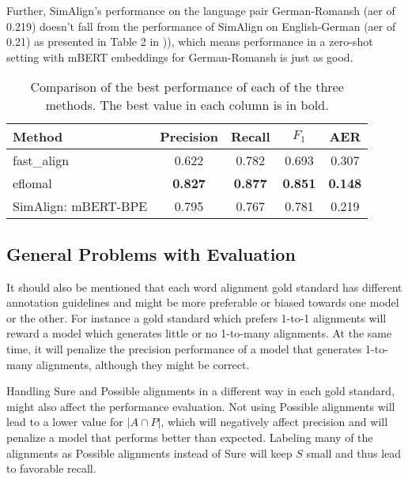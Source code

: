 Further,  SimAlign's performance on the language pair German-Romansh (\acrshort{aer} of 0.219) doesn't fall from the performance of SimAlign on English-German (\acrshort{aer} of 0.21)  as presented in Table 2 in \cite{jalili-sabet-etal-2020-simalign})), which means performance in a zero-shot setting  with mBERT embeddings  for German-Romansh is just as good.

\begin{table}
\centering
\begin{tabular}{lcccc}
	\toprule
							Method & Precision & Recall & $F_1$ & AER \\
\midrule
  fast\_align& 0.622	  & 0.782  & 0.693 & 0.307 \\

							eflomal     & \textbf{0.827} & \textbf{0.877} & \textbf{0.851} & \textbf{0.148} \\

SimAlign:                     mBERT-BPE & 0.795   & 0.767  & 0.781  & 0.219 \\
\bottomrule
\end{tabular}
\caption{Comparison of the best performance of each of the three methods. 
The best value in each column is in bold.}
\label{tab:comparison}
\end{table}


\subsection{General Problems with Evaluation}
\label{sec:problems-evaluation}
It should also be mentioned that each word alignment gold standard has different annotation guidelines and might be more preferable or biased towards one model or the other. 
For instance a gold standard which prefers 1-to-1 alignments will reward a model which generates little or no 1-to-many alignments. 
At the same time, it will penalize the precision performance of a model that generates 1-to-many alignments, although they might be correct.

Handling Sure and Possible alignments in a different way in each gold standard, might also affect the performance evaluation. 
Not using Possible alignments will lead to a lower value for $|A \cap P|$, which will negatively affect precision and will penalize a model that performs better than expected. 
Labeling many of the alignments as Possible alignments instead of Sure will keep $S$ small and thus lead to favorable recall. 


